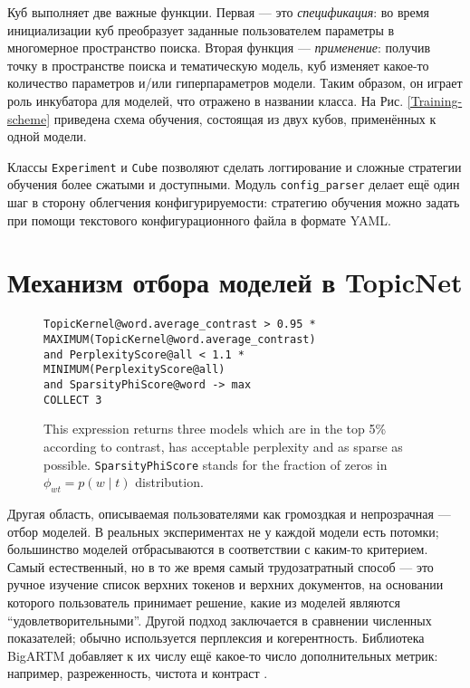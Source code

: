 Куб выполняет две важные функции. Первая --- это \textit{спецификация}: во время инициализации куб преобразует заданные пользователем параметры в многомерное пространство поиска. Вторая функция --- \textit{применение}: получив точку в пространстве поиска и тематическую модель, куб изменяет какое-то количество параметров и/или гиперпараметров модели. Таким образом, он играет роль инкубатора для моделей, что отражено в названии класса. На Рис.  \ref{Training-scheme} приведена схема обучения, состоящая из двух кубов, применённых к одной модели.

Классы \texttt{Experiment} и \texttt{Cube} позволяют сделать логгирование и сложные стратегии обучения более сжатыми и доступными. Модуль \texttt{config\_parser} делает ещё один шаг в сторону облегчения конфигурируемости: стратегию обучения можно задать при помощи текстового конфигурационного файла в формате YAML.


\section{Механизм отбора моделей в TopicNet}

\begin{figure*}[!ht]
\footnotesize
\texttt{TopicKernel@word.average\_contrast > 0.95 * MAXIMUM(TopicKernel@word.average\_contrast) \\
\hphantom{\ \ } and PerplexityScore@all < 1.1 * MINIMUM(PerplexityScore@all) \\
\hphantom{\ \ } and SparsityPhiScore@word -> max\\
\hphantom{\ \ } COLLECT 3}
\caption{This expression returns three models which are in the top 5\% according to contrast, has acceptable perplexity and as sparse as possible. \texttt{SparsityPhiScore} stands for the fraction of zeros in $\phi_{wt} = p(w \mid t)$ distribution.}
\label{DSL-example}
\end{figure*}

Другая область, описываемая пользователями как громоздкая и непрозрачная --- отбор моделей. В реальных экспериментах не у каждой модели есть потомки; большинство моделей отбрасываются в соответствии с каким-то критерием. Самый естественный, но в то же время самый трудозатратный способ --- это ручное изучение список верхних токенов и верхних документов, на основании которого пользователь принимает решение, какие из моделей являются ``удовлетворительными''. Другой подход заключается в сравнении численных показателей; обычно используется перплексия и когерентность. Библиотека \mbox{BigARTM} добавляет к их числу ещё какое-то число дополнительных метрик: например, разреженность, чистота и контраст \cite{voron15mlj}.

